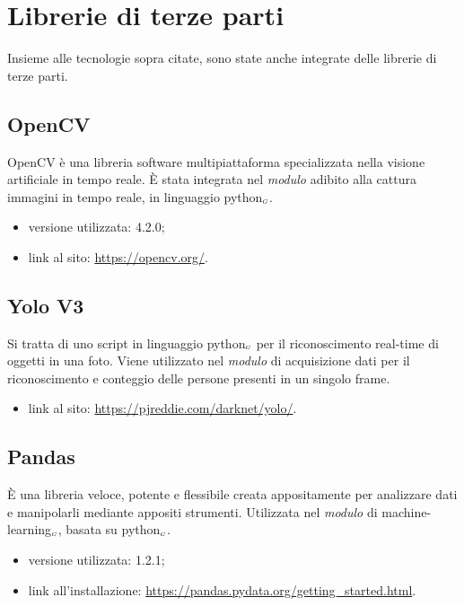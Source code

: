 \section{Librerie di terze parti}\label{LibrerieDiTerzeParti}
Insieme alle tecnologie sopra citate, sono state anche integrate delle librerie di terze parti.

\subsection{OpenCV}\label{LibrerieOpenCV}
OpenCV è una libreria software multipiattaforma specializzata nella visione artificiale in tempo reale.
È stata integrata nel \textit{modulo} adibito alla cattura immagini in tempo reale, in linguaggio python$_{\scaleto{G}{3pt}}$.

\begin{itemize}
  \item versione utilizzata: 4.2.0;
  \item link al sito: \url{https://opencv.org/}.
\end{itemize}

\subsection{Yolo V3}\label{LibrerieYoloV3}
Si tratta di uno script in linguaggio python$_{\scaleto{G}{3pt}}$ per il riconoscimento real-time di oggetti in una foto.
Viene utilizzato nel \textit{modulo} di acquisizione dati per il riconoscimento e conteggio delle persone presenti in un singolo frame.

\begin{itemize}
  \item link al sito: \url{https://pjreddie.com/darknet/yolo/}.
\end{itemize}

\subsection{Pandas}\label{LibreriePandas}
È una libreria veloce, potente e flessibile creata appositamente per analizzare dati e manipolarli mediante appositi strumenti.
Utilizzata nel \textit{modulo} di machine-learning$_{\scaleto{G}{3pt}}$, basata su python$_{\scaleto{G}{3pt}}$.

\begin{itemize}
  \item versione utilizzata: 1.2.1;
  \item link all'installazione: \url{https://pandas.pydata.org/getting_started.html}.
\end{itemize}

